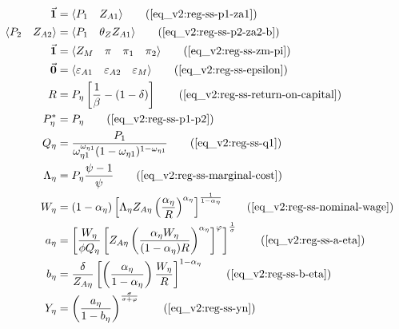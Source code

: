 \documentclass[../thesis.tex]{subfiles}
\begin{document}
	\begin{align}
		\vec{\bm{1}} &= \langle \begin{matrix} P_{1} & Z_{A1} \end{matrix} \rangle \tag{\ref{eq_v2:reg-ss-p1-za1}}
		\\ 
		\langle \begin{matrix} P_{2} & Z_{A2} \end{matrix} \rangle &= \langle \begin{matrix} P_{1} & \theta_{Z} Z_{A1} \end{matrix} \rangle \tag{\ref{eq_v2:reg-ss-p2-za2-b}}
		\\
		\vec{\bm{1}} &= \langle \begin{matrix} Z_{M} & \pi & \pi_{1} & \pi_{2} \end{matrix} \rangle \tag{\ref{eq_v2:reg-ss-zm-pi}}
		\\
		\vec{\bm{0}} &= \langle \begin{matrix} \varepsilon_{A1} & \varepsilon_{A2} & \varepsilon_{M} \end{matrix} \rangle \tag{\ref{eq_v2:reg-ss-epsilon}}
		\\
		R &= P_{\eta} \left[ \frac{1}{\beta} - (1- \delta) \right] \tag{\ref{eq_v2:reg-ss-return-on-capital}}
		\\
		P_{\eta}^{\ast} &= P_{\eta} \tag{\ref{eq_v2:reg-ss-p1-p2}} 
		\\
		Q_{\eta} &= \frac{ P_{1} }{\omega_{\eta 1}^{\omega_{\eta 1}} (1 - \omega_{\eta 1})^{1 - \omega_{\eta 1}}} \tag{\ref{eq_v2:reg-ss-q1}}
		\\
		\Lambda_{\eta} &= P_{\eta} \frac{\psi-1}{\psi} \tag{\ref{eq_v2:reg-ss-marginal-cost}} 
		\\
		W_{\eta} &= \left( 1 - \alpha_{\eta} \right) \left[ \Lambda_{\eta} Z_{A\eta} \left( \frac{\alpha_{\eta}}{R} \right)^{\alpha_{\eta}} \right]^{\frac{1}{1 - \alpha_{\eta}}} \tag{\ref{eq_v2:reg-ss-nominal-wage}}
		\\
		a_{\eta} &= \left[ \frac{W_{\eta}}{\phi Q_{\eta}} \left[ Z_{A\eta} \left( \frac{\alpha_{\eta} W_{\eta}}{(1 - \alpha_{\eta}) R} \right)^{\alpha_{\eta}} \right]^{\varphi} \right]^{\frac{1}{\sigma}} \tag{\ref{eq_v2:reg-ss-a-eta}}
		\\
		b_{\eta} &= \frac{\delta}{Z_{A\eta}} \left[ \left( \frac{{\alpha_{\eta}}}{1-\alpha_{\eta}} \right) \frac{W_{\eta}}{R} \right]^{1 - \alpha_{\eta}} \tag{\ref{eq_v2:reg-ss-b-eta}}
		\\
		Y_{\eta} &= \left( \frac{a_{\eta}}{1 - b_{\eta}} \right)^{\frac{\sigma}{\sigma + \varphi}} \tag{\ref{eq_v2:reg-ss-yn}}

\end{align}
\end{document}
